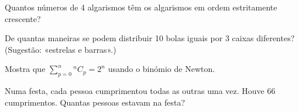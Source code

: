 \documentclass[12pt]{article}
\begin{document}
\begin{exercicios}
  \item Quantos números de 4 algarismos têm os algarismos em ordem estritamente crescente?
  \item De quantas maneiras se podem distribuir 10 bolas iguais por 3 caixas diferentes? (Sugestão: «estrelas e barras».)
  \item Mostra que $\sum_{p=0}^{n} {}^nC_p = 2^n$ usando o binómio de Newton.
  \item Numa festa, cada pessoa cumprimentou todas as outras uma vez. Houve 66 cumprimentos. Quantas pessoas estavam na festa?
\end{exercicios}
\end{document}
